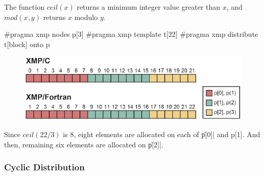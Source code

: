 \begin{mynote}
  The function $ceil(x)$ returns a minimum integer value greater than
  $x$, and $mod(x,y)$ returns $x$ modulo $y$.
\end{mynote}

\begin{XCexample}
#pragma xmp nodes p[3]
#pragma xmp template t[22]
#pragma xmp distribute t[block] onto p
\end{XCexample}


\begin{figure}
  \centering
  \includegraphics{figs/block.png}
\end{figure}

Since $ceil(22/3)$ is 8, eight elements are allocated on each of \|p[0]|
and p[1]. And then, remaining six elements are allocated on \|p[2]|.







\subsubsection{Cyclic Distribution}

